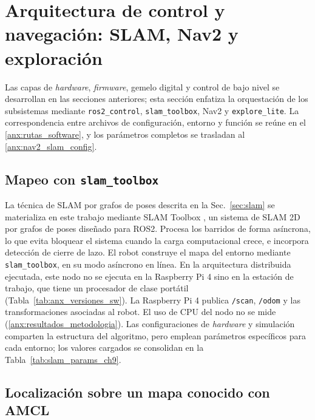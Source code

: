 \section{Arquitectura de control y navegación: SLAM, Nav2 y exploración}
\label{chap:app_control_nav}

Las capas de \textit{hardware}, \textit{firmware}, gemelo digital y control de bajo nivel se desarrollan en las secciones anteriores; esta sección enfatiza la orquestación de los subsistemas mediante \texttt{ros2\_control}, \texttt{slam\_toolbox}, Nav2 y \texttt{explore\_lite}. La correspondencia entre archivos de configuración, entorno y función se reúne en el \ref{anx:rutas_software}, y los parámetros completos se trasladan al \ref{anx:nav2_slam_config}.

\subsection{Mapeo con \texttt{slam\_toolbox}}
\label{sec:slam_ch9}

La técnica de SLAM por grafos de poses descrita en la Sec.~\ref{sec:slam} se
materializa en este trabajo mediante SLAM Toolbox
\citep{macenski2021slamtoolbox}, un sistema de SLAM 2D por grafos de poses
diseñado para \gls{ROS2}. Procesa los barridos de forma asíncrona, lo que
evita bloquear el sistema cuando la carga computacional crece, e incorpora
detección de cierre de lazo.
El robot construye el mapa del entorno mediante \texttt{slam\_toolbox}, en su modo asíncrono en línea. En la arquitectura distribuida ejecutada, este nodo no se ejecuta en la Raspberry Pi 4 sino en la estación de trabajo, que tiene un procesador de clase portátil (Tabla~\ref{tab:anx_versiones_sw}). La Raspberry Pi 4 publica \texttt{/scan}, \texttt{/odom} y las transformaciones asociadas al robot. El uso de CPU del nodo no se mide (\ref{anx:resultados_metodologia}).
Las configuraciones de \textit{hardware} y simulación comparten la estructura del
algoritmo, pero emplean parámetros específicos para cada entorno; los valores
cargados se consolidan en la Tabla~\ref{tab:slam_params_ch9}.

\subsection{Localización sobre un mapa conocido con AMCL}
\label{sec:amcl_ch9}


